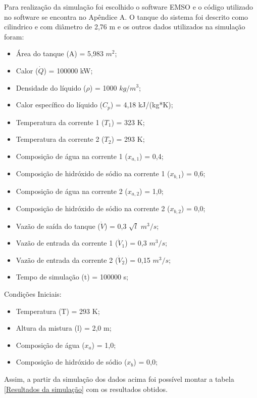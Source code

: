 \documentclass[
	12pt,				%
	openright,			%
	oneside,			%
	a4paper,			%
	english,			%
	french,				%
	spanish,			%
	brazil				%
	]{abntex2}
\begin{document}
Para realização da simulação foi escolhido o software EMSO e o código utilizado no software se encontra no Apêndice A. O tanque do sistema foi descrito como cilindrico e com diâmetro de 2,76 m e os outros dados utilizados na simulação foram:

\begin{itemize}
\item Área do tanque (A) = 5,983 $m^{2}$;
\item Calor ($\dot{Q}$) = 100000 kW;
\item Densidade do líquido ($\rho$) = 1000 $kg/m^{3}$;
\item Calor específico do líquido ($C_{p}$) = 4,18 kJ/(kg*K);
\item Temperatura da corrente 1 ($T_{1}$) = 323 K;
\item Temperatura da corrente 2 ($T_{2}$) = 293 K;
\item Composição de água na corrente 1 ($x_{a,1}$) = 0,4;
\item Composição de hidróxido de sódio na corrente 1 ($x_{b,1}$) = 0,6;
\item Composição de água na corrente 2 ($x_{a,2}$) = 1,0;
\item Composição de hidróxido de sódio na corrente 2 ($x_{b,2}$) = 0,0;
\item Vazão de saída do tanque ($\dot{V}$) = 0,3 $\sqrt{l}$ $m^{3}/s$;
\item Vazão de entrada da corrente 1 ($\dot{V}_{1}$) = 0,3 $m^{3}/s$;
\item Vazão de entrada da corrente 2 ($\dot{V}_{2}$) = 0,15 $m^{3}/s$;
\item Tempo de simulação (t) = 100000 s;
\end{itemize}

Condições Iniciais:

\begin{itemize}
\item Temperatura (T) = 293 K;
\item Altura da mistura (l) = 2,0 m;
\item Composição de água ($x_{a}$) = 1,0;
\item Composição de hidróxido de sódio ($x_{b}$) = 0,0;
\end{itemize}

Assim, a partir da simulação dos dados acima foi possível montar a tabela \ref{Resultados da simulação} com os resultados obtidos.

\begin{table}[H]
\centering
\caption{Resultados da simulação}
\label{Resultados da simulação}
\end{table}
\end{document}
